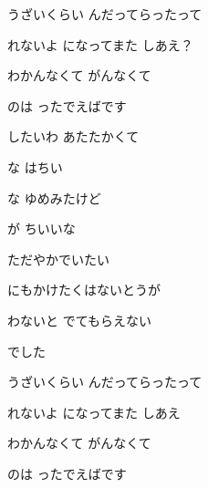 \documentclass[a4paper,tate,twocolumn,12pt]{ltjtarticle}
\begin{document}
\begin{flushleft}
\vspace{2em}

\noindent\begin{minipage}{\linewidth}
うざいくらい んだってらったって

れないよ になってまた しあえ？

わかんなくて がんなくて

のは ったでえばです
\end{minipage}

\vspace{2em}

\noindent\begin{minipage}{\linewidth}
したいわ あたたかくて

な はちい

な ゆめみたけど

が ちいいな
\end{minipage}

\vspace{2em}

\noindent\begin{minipage}{\linewidth}
ただやかでいたい

にもかけたくはないとうが

わないと でてもらえない

でした
\end{minipage}

\vspace{2em}

\noindent\begin{minipage}{\linewidth}
うざいくらい んだってらったって

れないよ になってまた しあえ

わかんなくて がんなくて

のは ったでえばです
\end{minipage}


\end{flushleft}
\end{document}
